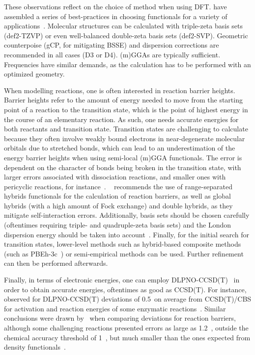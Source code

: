 These observations reflect on the choice of method when using DFT.
\citeauthor{Bursch_2022} have assembled a series of best-practices in choosing functionals for a variety of applications~\cite{Bursch_2022}.
Molecular structures can be calculated with triple-zeta basis sets (def2-TZVP)
or even well-balanced double-zeta basis sets (def2-SVP).
Geometric counterpoise (gCP,
for mitigating BSSE) and dispersion corrections are recommended in all cases (D3 or D4).
(m)GGAs are typically sufficient.
Frequencies have similar demands,
as the calculation has to be performed with an optimized geometry.

When modelling reactions,
one is often interested in reaction barrier heights.
Barrier heights refer to the amount of energy needed to move from the starting point of a reaction to the transition state,
which is the point of highest energy in the course of an elementary reaction.
As such,
one needs accurate energies for both reactants and transition state.
Transition states are challenging to calculate because they often involve weakly bound electrons
in near-degenerate molecular orbitals
due to stretched bonds,
which can lead to an underestimation of the energy barrier heights when using semi-local (m)GGA functionals.
The error is dependent on the character of bonds being broken in the transition state,
with larger errors associated with dissociation reactions,
and smaller ones with pericyclic reactions,
for instance~\cite{Bursch_2022}.
\citeauthor{Bursch_2022}~\cite{Bursch_2022} recommends the use of range-separated hybrids functionals for the calculation of reaction barriers,
as well as global hybrids (with a high amount of Fock exchange) and double hybrids,
as they mitigate self-interaction errors.
Additionally,
basis sets should be chosen carefully (oftentimes requiring triple- and quadruple-zeta basis sets) and the London dispersion energy should be taken into account~\cite{Bursch_2022}.
Finally,
for the initial search for transition states,
lower-level methods such as hybrid-based composite methods (such as PBEh-3c~\cite{Grimme_2015}) or semi-empirical methods can be used.
Further refinement can then be performed afterwards.

Finally,
in terms of electronic energies,
one can employ DLPNO-CCSD(T)~\cite{Riplinger_2013,Riplinger_2016}
in order to obtain accurate energies,
oftentimes
as good as CCSD(T).
For instance,~\cite{Paiva_2020} observed for DLPNO-CCSD(T)
deviations of 0.5~\kcalmol on average from CCSD(T)/CBS for
activation and reaction energies of some enzymatic reactions~\cite{Paiva_2020}.
Similar conclusions were drawn by~\cite{Sandler_2021}
when comparing deviations for reaction barriers,
although
some challenging reactions presented errors as large as 1.2~\kcalmol,
outside the chemical accuracy threshold of 1~\kcalmol,
but
much smaller than the ones expected from density functionals~\cite{Sandler_2021}.

